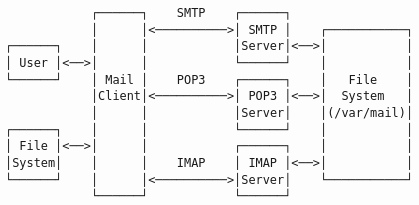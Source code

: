 \documentclass[varwidth=25cm,crop]{standalone}
\begin{document}
\begin{verbatim}
            ┌──────┐    SMTP    ┌──────┐
            │      │<──────────>│ SMTP │    ┌───────────┐
┌──────┐    │      │            │Server│<──>│           │
│ User │<──>│      │            └──────┘    │           │
└──────┘    │ Mail │    POP3    ┌──────┐    │   File    │
            │Client│<──────────>│ POP3 │<──>│  System   │
            │      │            │Server│    │(/var/mail)│
┌──────┐    │      │            └──────┘    │           │
│ File │<──>│      │            ┌──────┐    │           │
│System│    │      │    IMAP    │ IMAP │<──>│           │
└──────┘    │      │<──────────>│Server│    └───────────┘
            └──────┘            └──────┘
\end{verbatim}
\end{document}
